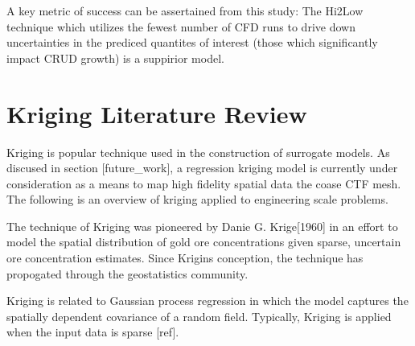 A key metric of success can be assertained from this study:  The Hi2Low technique which utilizes the fewest number of CFD runs to drive down uncertainties in the prediced quantites of interest (those which significantly impact CRUD growth) is a suppirior model.


\section{Kriging Literature Review}

Kriging is popular technique used in the construction of surrogate models.  As discused in section [future_work], a regression kriging model is currently under consideration as a means to map high fidelity spatial data the coase CTF mesh. The following is an overview of kriging applied to engineering scale problems.

The technique of Kriging was pioneered by Danie G. Krige[1960] in an effort to model the spatial distribution of gold ore concentrations given sparse, uncertain ore concentration estimates. Since Krigins conception, the technique has propogated through the geostatistics community.

Kriging is related to Gaussian process regression in which the model captures the spatially dependent covariance of a random field.  Typically, Kriging is applied when the input data is sparse [ref].
